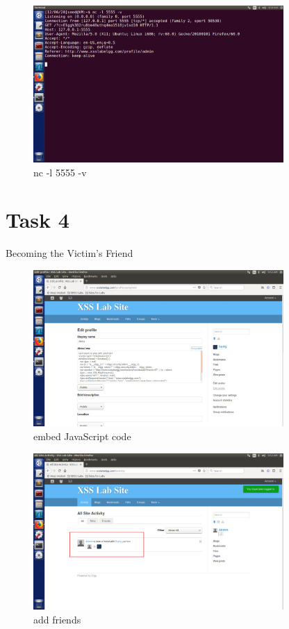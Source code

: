 \documentclass[onecolumn,oneside]{SUSTechHomework}
\begin{document}
  \begin{figure}[H]
    \centering
    \includegraphics[width=0.85\textwidth]{img/task3_2.png}
    \caption{nc -l 5555 -v}
  \end{figure}

  \section*{Task 4}
  Becoming the Victim’s Friend

  \begin{figure}[H]
    \centering
    \includegraphics[width=0.85\textwidth]{img/task4_1.png}
    \caption{embed JavaScript code} 
  \end{figure}

  \begin{figure}[H]
    \centering
    \includegraphics[width=0.85\textwidth]{img/task4_2.png}
    \caption{add friends}
  \end{figure}
\end{document}

